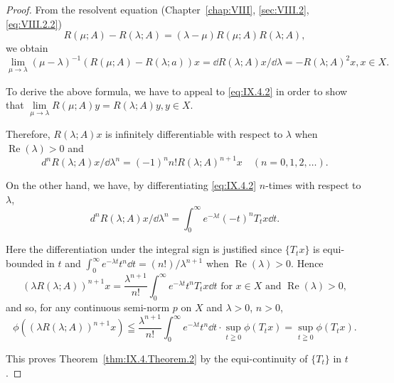 \begin{proof}
 From the resolvent equation (Chapter~\ref{chap:VIII}, \ref{sec:VIII.2}, \eqref{eq:VIII.2.2}) 
\[
R (\mu ; A) - R (\lambda ; A) = (\lambda - \mu) R (\mu ; A) R (\lambda ; A),
\]
we obtain 
\[
\lim\limits _{\mu \rightarrow \lambda} (\mu - \lambda) ^{-1} (R (\mu ; A) - R (\lambda ; a)) x = \dd R (\lambda ; A) x / \dd \lambda = - R (\lambda ; A) ^{2} x, x \in X. \]

To derive the above formula, we have to appeal to \eqref{eq:IX.4.2} in order to show that $\lim\limits_{\mu \to \lambda} R(\mu; A)y = R(\lambda; A)y, y \in X$. 


Therefore, $R(\lambda; A) x$ is infinitely differentiable with respect to $\lambda$ when $\operatorname{Re}(\lambda) > 0$ and 
\begin{equation}\label{eq:IX.4.8}
d ^{n} R (\lambda ; A) x / \dd \lambda^{n} = (- 1) ^{n} n! R (\lambda ; A) ^{n+1} x \quad (n = 0, 1, 2, \dots).
\end{equation}

On the other hand, we have, by differentiating \eqref{eq:IX.4.2} $n$-times with respect to $\lambda$, 
\begin{equation}\label{eq:IX.4.9}
d ^{n} R (\lambda ; A) x / \dd \lambda^{n} = \int_{0} ^{\infty} e ^{- \lambda t} (- t) ^{n} T _{t} x \dd t.
\end{equation}

Here the differentiation under the integral sign is justified since $\{T_t x\}$ is equi-bounded in $t$ and $\int_0^\infty e^{-\lambda t} t^n \dd t = (n!) / \lambda^{n+1}$ when $\operatorname{Re}(\lambda) > 0$. Hence 
\begin{equation}\label{eq:IX.4.10}
(\lambda R (\lambda ; A)) ^{n+1} x = \frac {\lambda^{n+1}}{n !} \int_{0} ^{\infty} e ^{- \lambda t} t ^{n} T _{t} x \dd t \text{ for } x \in X \text{ and } \operatorname{Re} (\lambda) > 0,
\end{equation}
and so, for any continuous semi-norm $p$ on $X$ and $\lambda > 0$, $n > 0$, 
\begin{equation}\label{eq:IX.4.11}
\phi ((\lambda R (\lambda ; A)) ^{n+1} x) \leqq \frac {\lambda^{n+1}}{n !} \int_{0} ^{\infty} e ^{- \lambda t} t ^{n} \dd t \cdot \sup\limits _{t \geqq 0} \phi (T _{t} x) = \sup\limits _{t \geqq 0} \phi (T _{t} x).
\end{equation}

This proves Theorem~\ref{thm:IX.4.Theorem.2} by the equi-continuity of $\{T_t\}$ in $t$. 
\end{proof}


